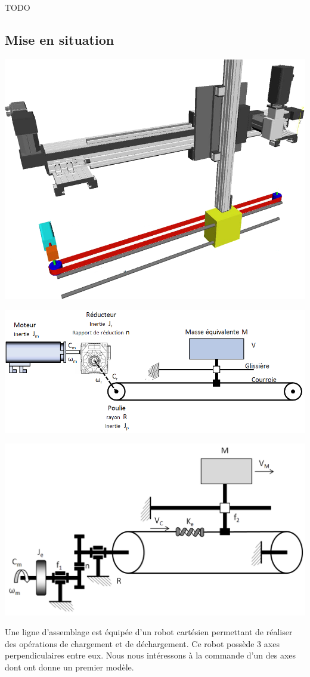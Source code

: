 \documentclass[10pt,fleqn]{article} %
\begin{document}

\vspace{10cm}
\pagestyle{fancy}
\thispagestyle{plain}


\def\columnseprulecolor{\color{ocre}}
\setlength{\columnseprule}{0.4pt} 
\ifprof
\else
\begin{multicols}{2}
\fi

\begin{obj} 
TODO
\end{obj}

\subsection*{Mise en situation}
\ifprof
\else
\begin{center}
\includegraphics[width=.45\textwidth]{images/RobotCartesien}
\end{center}


\begin{center}

\includegraphics[width=.45\textwidth]{images/chaine_01}

\includegraphics[width=.45\textwidth]{images/chaine_02}
\end{center}

Une ligne d'assemblage est équipée d'un robot cartésien permettant de réaliser des opérations de chargement et de déchargement. Ce robot possède 3 axes perpendiculaires entre eux. 
Nous nous intéressons à la commande d'un des axes dont ont donne un premier modèle.


\end{multicols}
\end{document}
